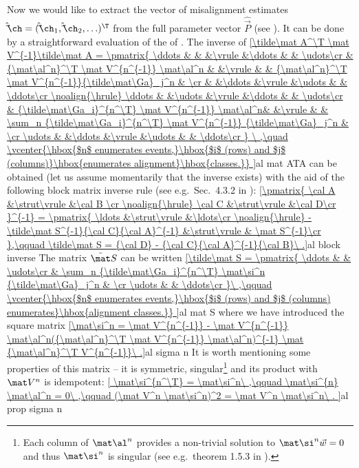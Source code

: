 Now we would like to extract the vector of misalignment estimates $\hat\vec\ch = (\hat\vec\ch_1, \hat\vec\ch_2, \ldots)^\T$ from the full parameter vector $\hat\vec P$ (see ). It can be done by a straightforward evaluation of the \rhs{} of . The inverse of
\eqref{\tilde\mat A^\T \mat V^{-1}\tilde\mat A =
\pmatrix{
\ddots 	& 											& 		&\vrule &\ddots & 														& \udots\cr
	 	& {\mat\al^n}^\T \mat V^{n^{-1}} \mat\al^n	& 		&\vrule & 		& {\mat\al^n}^\T \mat V^{n^{-1}}{\tilde\mat\Ga}_j^n 			& 		\cr
 		& 											&\ddots &\vrule &\udots & 														& \ddots\cr
\noalign{\hrule}
\ddots 	& 											&\udots	&\vrule &\ddots & 														& \udots\cr
	 	& {\tilde\mat\Ga_i}^{n^\T} \mat V^{n^{-1}} \mat\al^n& 		&\vrule & 		& \sum_n {\tilde\mat\Ga_i}^{n^\T} \mat V^{n^{-1}} {\tilde\mat\Ga}_j^n 	& \cr
\udots	& 											&\ddots &\vrule &\udots & 														& \ddots\cr
}
\ ,\quad 
\vcenter{\hbox{$n$ enumerates events,}\hbox{$i$ (rows) and $j$ (columns)}\hbox{enumerates alignment}\hbox{classes.}}
}{al mat ATA}
can be obtained (let us assume momentarily that the inverse exists) with the aid of the following block matrix inverse rule (see e.g.~Sec.~4.3.2 in ):
\eqref{\pmatrix{
	\cal A	&\strut\vrule	&\cal B	\cr
	\noalign{\hrule}
	\cal C	&\strut\vrule	&\cal D\cr
	}^{-1} = \pmatrix{
	\ldots							&\strut\vrule	&\ldots\cr
	\noalign{\hrule}
	-\tilde\mat S^{-1}{\cal C}{\cal A}^{-1}	&\strut\vrule	& \mat S^{-1}\cr
},\qquad \tilde\mat S = {\cal D} - {\cal C}{\cal A}^{-1}{\cal B}\ .}{al block inverse}
The matrix $\tilde\mat S$ can be written
\eqref{\tilde\mat S = \pmatrix{
	\ddots	& 																		& \udots\cr
			& \sum_n {\tilde\mat\Ga_i}^{n^\T} \mat\si^n {\tilde\mat\Ga}_j^n 	& \cr
	\udots	& 																		& \ddots\cr
}\ ,\qquad
\vcenter{\hbox{$n$ enumerates events,}\hbox{$i$ (rows) and $j$ (columns) enumerates}\hbox{alignment classes.}}
}{al mat S}
where we have introduced the square matrix
\eqref{\mat\si^n = \mat V^{n^{-1}} - \mat V^{n^{-1}} \mat\al^n({\mat\al^n}^\T \mat V^{n^{-1}} \mat\al^n)^{-1} \mat {\mat\al^n}^\T V^{n^{-1}}\ .}{al sigma n}
It is worth mentioning some properties of this matrix -- it is symmetric, singular\footnote{%
Each column of $\mat\al^n$ provides a non-trivial solution to $\mat\si^{n} \vec w = 0$ and thus $\mat\si^n$ is singular (see e.g.~theorem 1.5.3 in ).} and its product with $\mat V^n$ is idempotent:
\eqref{
	\mat\si^{n^\T} = \mat\si^n\ ,\qquad
	\mat\si^{n} \mat\al^n = 0\ ,\qquad
	(\mat V^n \mat\si^n)^2 = \mat V^n \mat\si^n\ .
}{al prop sigma n}

